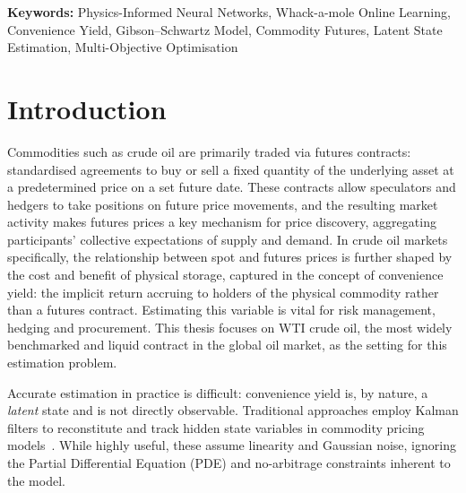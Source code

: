 \documentclass[11pt, a4paper]{article}
\begin{document}
\vspace{0.3cm}
\noindent\textbf{Keywords:} Physics-Informed Neural Networks, Whack-a-mole Online Learning,
Convenience Yield, Gibson--Schwartz Model, Commodity Futures, Latent State Estimation,
Multi-Objective Optimisation



\section{Introduction}
\label{sec:introduction}

Commodities such as crude oil are primarily traded via futures contracts: standardised agreements to buy or sell a fixed quantity of the underlying asset at a predetermined price on a set future date. These contracts allow speculators and hedgers to take positions on future price movements, and the resulting market activity makes futures prices a key mechanism for price discovery, aggregating participants' collective expectations of supply and demand. In crude oil markets specifically, the relationship between spot and futures prices is further shaped by the cost and benefit of physical storage, captured in the concept of convenience yield: the implicit return accruing to holders of the physical commodity rather than a futures contract. Estimating this variable is vital for risk management, hedging and procurement. This thesis focuses on WTI crude oil, the most widely benchmarked and liquid contract in the global oil market, as the setting for this estimation problem.

Accurate estimation in practice is difficult: convenience yield is, by nature, a \textit{latent} state and is not directly observable. Traditional approaches employ Kalman filters to reconstitute and track hidden state variables in commodity pricing models~\cite{Schwartz1997TheHedging}. While highly useful, these assume linearity and Gaussian noise, ignoring the Partial Differential Equation (PDE) and no-arbitrage constraints inherent to the model.
\end{document}
